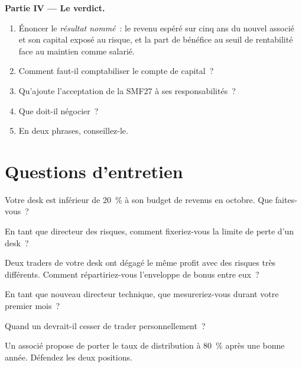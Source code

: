 \begin{problem}
\medskip\noindent\textbf{Partie IV --- Le verdict.}
\begin{enumerate}[resume]
\item Énoncer le \emph{résultat nommé}~: le revenu espéré sur cinq ans du nouvel associé et son capital exposé au risque, et la
part de bénéfice au seuil de rentabilité face au maintien comme  salarié.
\item Comment faut-il comptabiliser le compte de capital~?
\item Qu'ajoute l'acceptation de la SMF27 à ses responsabilités~?
\item Que doit-il négocier~?
\item En deux phrases, conseillez-le.
\end{enumerate}
\end{problem}

\section{Questions d'entretien}

\begin{interviewq}\label{iq:in:leadership-roles:1}
Votre desk est inférieur de 20~\% à son budget de revenus en octobre. Que faites-vous~?
\end{interviewq}

\begin{interviewq}\label{iq:in:leadership-roles:2}
En tant que directeur des risques, comment fixeriez-vous la limite de perte d'un desk~?
\end{interviewq}

\begin{interviewq}\label{iq:in:leadership-roles:3}
Deux traders de votre desk ont dégagé le même profit avec des risques très différents. Comment répartiriez-vous l'enveloppe de bonus entre eux~?
\end{interviewq}

\begin{interviewq}\label{iq:in:leadership-roles:4}
En tant que nouveau directeur technique, que mesureriez-vous durant votre premier mois~?
\end{interviewq}

\begin{interviewq}\label{iq:in:leadership-roles:5}
Quand un  devrait-il cesser de trader personnellement~?
\end{interviewq}

\begin{interviewq}\label{iq:in:leadership-roles:6}
Un associé propose de porter le taux de distribution à 80~\% après une bonne année. Défendez les deux positions.
\end{interviewq}
